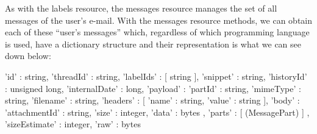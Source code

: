 As with the labels resource, the messages resource manages the set of all messages of the user's e-mail. With the messages resource methods, we can obtain each of these ``user's messages'' which, regardless of which programming language is used, have a dictionary structure and their representation is what we can see down below:

\begin{python}
	{
		'id' : string,
		'threadId' : string,
		'labelIds' : [ string ],
		'snippet' : string,
		'historyId' : unsigned long,
		'internalDate' : long,
		'payload' : {
			'partId' : string,
			'mimeType' : string,
			'filename' : string,
			'headers' : [
			{
				'name' : string,
				'value' : string
			}
			],
			'body' : {
				'attachmentId' : string,
				'size' : integer,
				'data' : bytes
			},
			'parts' : [ (MessagePart) ]
		},
		'sizeEstimate' : integer,
		'raw' : bytes
	}
\end{python}

